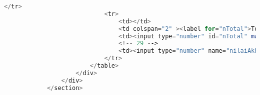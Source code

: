 \begin{lstlisting}[language=PHP,basicstyle=\tiny,caption=skripsi.php]
							</tr>
							<tr>
								<td></td>
								<td colspan="2" ><label for="nTotal">Total</label></td>
								<td><input type="number" id="nTotal" max="100" disabled="disabled" value={{ketua.value+anggota.value+pembimbing.value+koordinator.value}} class="form-nilai"/></td>
								<!-- 29 -->
								<td><input type="number" name="nilaiAkhirMahasiswa" value= "{{(nilai_TTLaporanK * TTLaporanK.value / 100 + nilai_KMateriK * KMateriK.value / 100 + nilai_PMateriK * PMateriK.value / 100 + nilai_PresentasiK * presentasiK.value / 100 + nilai_PTujuanK * PTujuanK.value / 100 )* ketua.value / 100 + (nilai_TTLaporanA * TTLaporanA.value / 100 + nilai_KMateriA * KMateriA.value / 100 + nilai_PMateriA * PMateriA.value / 100 + nilai_PresentasiA * presentasiA.value / 100 + nilai_PTujuanA * PTujuanA.value / 100) * anggota.value / 100 + (nilai_TTLaporanP * TTLaporanP.value / 100 + nilai_KMateriP * KMateriP.value / 100 + nilai_PMateriP * PMateriP.value / 100 + nilai_PBimbinganP * PBimbinganP.value / 100) * pembimbing.value / 100 + nilai_koordinator * koordinator.value / 100}}" class="form-nilai"/></td>
							</tr>
						</table>
					</div> 
				</div>
			</section>
			
			
			

\end{lstlisting}
